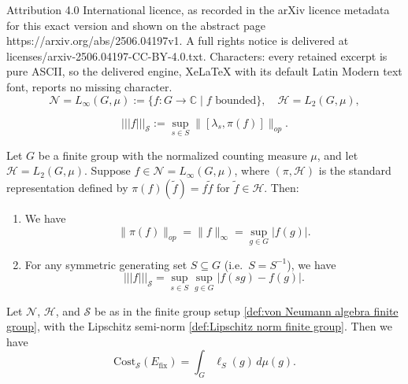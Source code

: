 \documentclass[10pt,a4paper]{amsart}
\newcommand{\Cost}{\mathrm{Cost}}
\newcommand{\fix}{\mathrm{fix}}
\newcommand{\mc}{\mathcal}
\newcommand{\wt}{\widetilde}
\begin{document}
Attribution 4.0 International licence, as recorded in the arXiv licence metadata for this exact version and shown on the abstract page https://arxiv.org/abs/2506.04197v1. A full rights notice is delivered at licenses/arxiv-2506.04197-CC-BY-4.0.txt. Characters: every retained excerpt is pure ASCII, so the delivered engine, XeLaTeX with its default Latin Modern text font, reports no missing character.
\begin{equation}\label{def:von Neumann algebra finite group}
    \mathcal{N} = L_{\infty}(G,\mu) := \{ f : G \to \mathbb{C} \mid f \text{ bounded} \}, \quad \mathcal{H} = L_2(G,\mu),
\end{equation}

\begin{equation}\label{def:Lipschitz norm finite group}
    ||| f |||_{\mathcal{S}} := \sup_{s \in S} \|[\lambda_s, \pi(f)]\|_{op}.
\end{equation}

\begin{lemma}\label{lemma:calculation finite group}
    Let $G$ be a finite group with the normalized counting measure $\mu$, and let $\mc H = L_2(G,\mu)$. Suppose $f \in \mc N = L_{\infty}(G,\mu)$, where $(\pi,\mc H)$ is the standard representation defined by $\pi(f)(\wt f) = f\wt f$ for $\wt f \in \mc H$. Then:
    \begin{enumerate}
        \item We have
        \[
            \|\pi(f)\|_{op} = \|f\|_{\infty} = \sup_{g \in G} |f(g)|.
        \]
        \item For any symmetric generating set $S \subseteq G$ (i.e.\ $S=S^{-1}$), we have
        \[
            |||f|||_{\mc S} = \sup_{s\in S} \sup_{g \in G}|f(sg) - f(g)|.
        \]
    \end{enumerate}
\end{lemma}

\begin{theorem}\label{thm:expected_length}
    Let $\mc N$, $\mc H$, and $\mc S$ be as in the finite group setup \eqref{def:von Neumann algebra finite group}, with the Lipschitz semi-norm \eqref{def:Lipschitz norm finite group}. Then we have
    \[
        \Cost_{\mc S}(E_{\fix})= \int_G \ell_{S}(g)\, d\mu(g).
    \]
\end{theorem}
\end{document}
